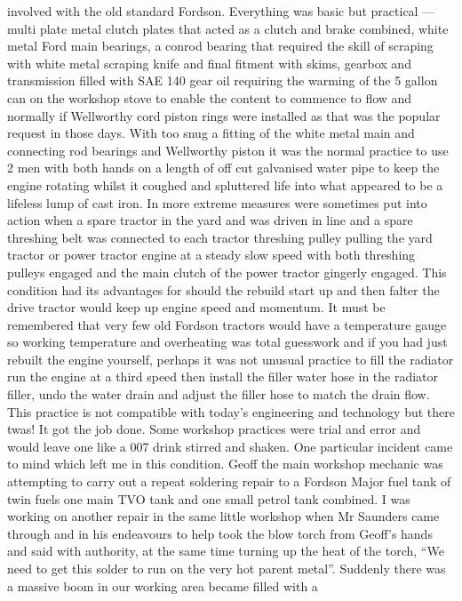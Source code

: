 involved with the old standard Fordson. Everything was basic but practical ---
multi plate metal clutch plates that acted as a clutch and brake combined,
white metal Ford main bearings, a conrod bearing that required the skill of
scraping with white metal scraping knife and final fitment with skims, gearbox
and transmission filled with SAE 140 gear oil requiring the warming of the 5
gallon can on the workshop stove to enable the content to commence to flow and
normally if Wellworthy cord piston rings were installed as that was the popular
request in those days. With too snug a fitting of the white metal main and
connecting rod bearings and Wellworthy piston it was the normal practice to use
2 men with both hands on a length of off cut galvanised water pipe to keep the
engine rotating whilst it coughed and spluttered life into what appeared to be
a lifeless lump of cast iron. In more extreme measures were sometimes put into
action when a spare tractor in the yard and was driven in line and a spare
threshing belt was connected to each tractor threshing pulley pulling the yard
tractor or power tractor engine at a steady slow speed with both threshing
pulleys engaged and the main clutch of the power tractor gingerly engaged. This
condition had its advantages for should the rebuild start up and then falter
the drive tractor would keep up engine speed and momentum. It must be
remembered that very few old Fordson tractors would have a temperature gauge so
working temperature and overheating was total guesswork and if you had just
rebuilt the engine yourself, perhaps it was not unusual practice to fill the
radiator run the engine at a third speed then install the filler water hose in
the radiator filler, undo the water drain and adjust the filler hose to match
the drain flow. This practice is not compatible with today's engineering and
technology but there twas! It got the job done. Some workshop practices were
trial and error and would leave one like a 007 drink stirred and shaken. One
particular incident came to mind which left me in this condition. Geoff the
main workshop mechanic was attempting to carry out a repeat soldering repair to
a Fordson Major fuel tank of twin fuels one main TVO tank and one small petrol
tank combined. I was working on another repair in the same little workshop when
Mr Saunders came through and in his endeavours to help took the blow torch from
Geoff's hands and said with authority, at the same time turning up the heat of
the torch, ``We need to get this solder to run on the very hot parent metal''.
Suddenly there was a massive boom in our working area became filled with a
